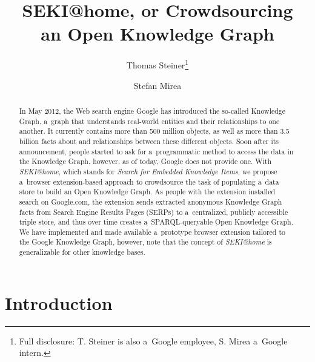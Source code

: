\documentclass[runningheads,a4paper]{llncs}
\begin{document}
\title{SEKI@home, or Crowdsourcing\\ an Open Knowledge Graph}

\author{
  Thomas Steiner\thanks{Full disclosure: T. Steiner is also a~Google employee, S. Mirea a~Google intern.} \and
  Stefan Mirea
}


\maketitle
\setcounter{footnote}{0}

\begin{abstract}
In May 2012, the Web search engine Google has introduced the so-called Knowledge Graph,
a~graph that understands real-world entities and their relationships to one another.
It currently contains more than 500 million objects,
as well as more than 3.5 billion facts about
and relationships between these different objects.
Soon after its announcement, people started to ask
for a~programmatic method to access the data in the Knowledge Graph,
however, as of today, Google does not provide one.
With \emph{SEKI@home}, which stands for \emph{Search for Embedded Knowledge Items},
we propose a~browser extension-based approach
to crowdsource the task of populating a~data store to build an Open Knowledge Graph.
As people with the extension installed search on Google.com,
the extension sends extracted anonymous Knowledge Graph facts from Search Engine Results Pages (SERPs)
to a~centralized, publicly accessible triple store,
and thus over time creates a~SPARQL-queryable Open Knowledge Graph.
We have implemented and made available a~prototype browser extension
tailored to the Google Knowledge Graph, however,
note that the concept of \emph{SEKI@home} is generalizable for other knowledge bases.
\end{abstract}

\section{Introduction}
\end{document}
